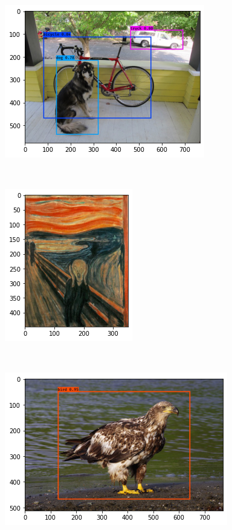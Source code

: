 \documentclass[11pt]{article}
\begin{document}
    \begin{center}
    \includegraphics{output_29_1}
    \end{center}
    { \hspace*{\fill} \\}
    
    \begin{center}
    \includegraphics{output_29_2}
    \end{center}
    { \hspace*{\fill} \\}
    
    \begin{center}
    \includegraphics{output_29_3}
    \end{center}
    { \hspace*{\fill} \\}
    
\end{document}
